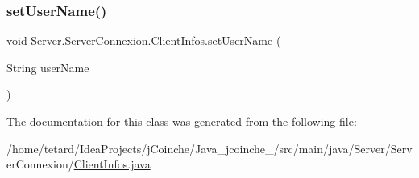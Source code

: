 \subsubsection{\texorpdfstring{set\+User\+Name()}{setUserName()}}
{\footnotesize\ttfamily void Server.\+Server\+Connexion.\+Client\+Infos.\+set\+User\+Name (\begin{DoxyParamCaption}\item[{String}]{user\+Name }\end{DoxyParamCaption})\hspace{0.3cm}{\ttfamily [inline]}}



The documentation for this class was generated from the following file\+:\begin{DoxyCompactItemize}
\item 
/home/tetard/\+Idea\+Projects/j\+Coinche/\+Java\+\_\+jcoinche\+\_/src/main/java/\+Server/\+Server\+Connexion/\mbox{\hyperlink{ClientInfos_8java}{Client\+Infos.\+java}}\end{DoxyCompactItemize}
